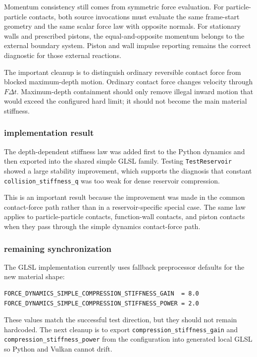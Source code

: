 Momentum consistency still comes from symmetric force evaluation.  For
particle-particle contacts, both source invocations must evaluate the same
frame-start geometry and the same scalar force law with opposite normals.  For
stationary walls and prescribed pistons, the equal-and-opposite momentum
belongs to the external boundary system.  Piston and wall impulse reporting
remains the correct diagnostic for those external reactions.

The important cleanup is to distinguish ordinary reversible contact force
from blocked maximum-depth motion.  Ordinary contact force changes velocity
through \(F\Delta t\).  Maximum-depth containment should only remove illegal
inward motion that would exceed the configured hard limit; it should not
become the main material stiffness.

\subsubsection{implementation result}

The depth-dependent stiffness law was added first to the Python dynamics and
then exported into the shared simple GLSL family.  Testing
\texttt{TestReservoir} showed a large stability improvement, which supports
the diagnosis that constant \texttt{collision\_stiffness\_q} was too weak for
dense reservoir compression.

This is an important result because the improvement was made in the common
contact-force path rather than in a reservoir-specific special case.  The same
law applies to particle-particle contacts, function-wall contacts, and piston
contacts when they pass through the simple dynamics contact-force path.

\subsubsection{remaining synchronization}

The GLSL implementation currently uses fallback preprocessor defaults for the
new material shape:
\begin{verbatim}
FORCE_DYNAMICS_SIMPLE_COMPRESSION_STIFFNESS_GAIN  = 8.0
FORCE_DYNAMICS_SIMPLE_COMPRESSION_STIFFNESS_POWER = 2.0
\end{verbatim}
These values match the successful test direction, but they should not remain
hardcoded.  The next cleanup is to export
\texttt{compression\_stiffness\_gain} and
\texttt{compression\_stiffness\_power} from the configuration into generated
local GLSL so Python and Vulkan cannot drift.

